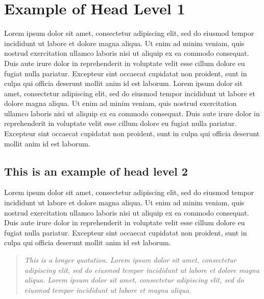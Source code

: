 \documentclass[english]{sbcreviews-2025}%
\begin{document}
\section{Example of Head Level 1}
Lorem ipsum dolor sit amet, consectetur adipiscing elit, sed do eiusmod tempor incididunt ut labore et dolore magna aliqua. Ut enim ad minim veniam, quis nostrud exercitation ullamco laboris nisi ut aliquip ex ea commodo consequat. Duis aute irure dolor in reprehenderit in voluptate velit esse cillum dolore eu fugiat nulla pariatur. Excepteur sint occaecat cupidatat non proident, sunt in culpa qui officia deserunt mollit anim id est laborum. Lorem ipsum dolor sit amet, consectetur adipiscing elit, sed do eiusmod tempor incididunt ut labore et dolore magna aliqua. Ut enim ad minim veniam, quis nostrud exercitation ullamco laboris nisi ut aliquip ex ea commodo consequat. Duis aute irure dolor in reprehenderit in voluptate velit esse cillum dolore eu fugiat nulla pariatur. Excepteur sint occaecat cupidatat non proident, sunt in culpa qui officia deserunt mollit anim id est laborum.

\subsection{This is an example of head level 2}

Lorem ipsum dolor sit amet, consectetur adipiscing elit, sed do eiusmod tempor incididunt ut labore et dolore magna aliqua. Ut enim ad minim veniam, quis nostrud exercitation ullamco laboris nisi ut aliquip ex ea commodo consequat. Duis aute irure dolor in reprehenderit in voluptate velit esse cillum dolore eu fugiat nulla pariatur. Excepteur sint occaecat cupidatat non proident, sunt in culpa qui officia deserunt mollit anim id est laborum.

\begin{quotation}
\textit{This is a longer quotation. Lorem ipsum dolor sit amet, consectetur adipiscing elit, sed do eiusmod tempor incididunt ut labore et dolore magna aliqua. Lorem ipsum dolor sit amet, consectetur adipiscing elit, sed do eiusmod tempor incididunt ut labore et magna aliqua. 
}\end{quotation} 
\end{document}
